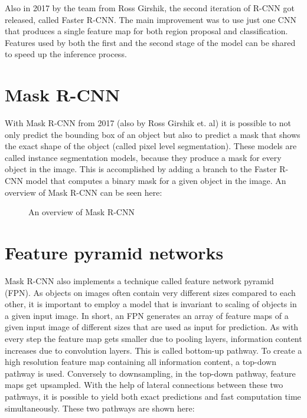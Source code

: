 Also in 2017 by the team from Ross Girshik, the second iteration of R-CNN got released, called Faster R-CNN. The main improvement was to use just one CNN that produces a single feature map for both region proposal and classification. Features used by both the first and the second stage of the model can be shared to speed up the inference process.

\section{Mask R-CNN}

With Mask R-CNN from 2017 (also by Ross Girshik et. al) it is possible to not only predict the bounding box of an object but also to predict a mask that shows the exact shape of the object (called pixel level segmentation). These models are called instance segmentation models, because they produce a mask for every object in the image. This is accomplished by adding a branch to the Faster R-CNN model that computes a binary mask for a given object in the image. An overview of Mask R-CNN can be seen here:

\begin{figure}[H]
	\caption{\label{fig:maskrcnn2} An overview of Mask R-CNN}
\end{figure}

\section{Feature pyramid networks}
\label{fpn}

Mask R-CNN also implements a technique called feature network pyramid (FPN). As objects on images often contain very different sizes compared to each other, it is important to employ a model that is invariant to scaling of objects in a given input image. In short, an FPN generates an array of feature maps of a given input image of different sizes that are used as input for prediction. As with every step the feature map gets smaller due to pooling layers, information content increases due to convolution layers. This is called bottom-up pathway. To create a high resolution feature map containing all information content, a top-down pathway is used. Conversely to downsampling, in the top-down pathway, feature maps get upsampled. With the help of lateral connections between these two pathways, it is possible to yield both exact predictions and fast computation time simultaneously. These two pathways are shown here:

